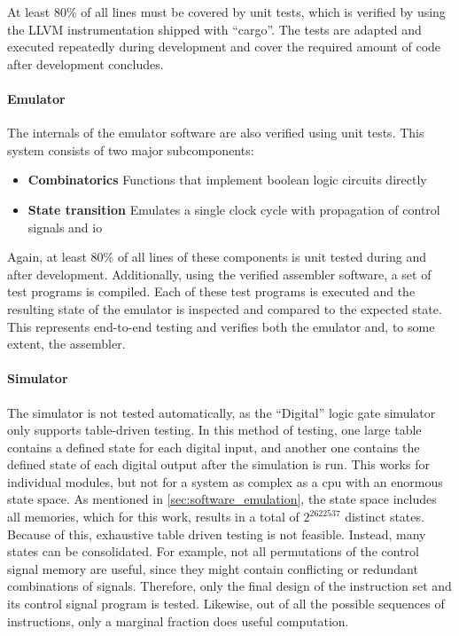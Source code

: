 At least $80\%$ of all lines must be covered by unit tests, which is verified by using the LLVM instrumentation shipped with ``cargo''. The tests are adapted and executed repeatedly during development and cover the required amount of code after development concludes.

\paragraph*{Emulator}

The internals of the emulator software are also verified using unit tests. This system consists of two major subcomponents:

\begin{itemize}
    \item \textbf{Combinatorics} Functions that implement boolean logic circuits directly
    \item \textbf{State transition} Emulates a single clock cycle with propagation of control signals and \ac{io}
\end{itemize}

Again, at least $80\%$ of all lines of these components is unit tested during and after development. Additionally, using the verified assembler software, a set of test programs is compiled. Each of these test programs is executed and the resulting state of the emulator is inspected and compared to the expected state. This represents end-to-end testing and verifies both the emulator and, to some extent, the assembler.

\paragraph*{Simulator}

The simulator is not tested automatically, as the ``Digital'' logic gate simulator only supports table-driven testing. In this method of testing, one large table contains a defined state for each digital input, and another one contains the defined state of each digital output after the simulation is run. This works for individual modules, but not for a system as complex as a \ac{cpu} with an enormous state space. As mentioned in \autoref{sec:software_emulation}, the state space includes all memories, which for this work, results in a total of $2^{2622537}$ distinct states. Because of this, exhaustive table driven testing is not feasible. Instead, many states can be consolidated. For example, not all permutations of the control signal memory are useful, since they might contain conflicting or redundant combinations of signals. Therefore, only the final design of the instruction set and its control signal program is tested. Likewise, out of all the possible sequences of instructions, only a marginal fraction does useful computation.

